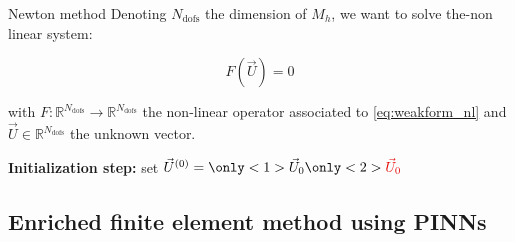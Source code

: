 \begin{frame}{Newton method}
	Denoting $N_\text{dofs}$ the dimension of $M_h$, we want to solve the-non linear system:

    \normalsize
    \vspace{-10pt}
    \begin{equation*}
        F(\vec{U}) = 0 
    \end{equation*}

    with $F:\mathbb{R}^{N_\text{dofs}} \to \mathbb{R}^{N_\text{dofs}}$ the non-linear operator associated to \eqref{eq:weakform_nl} and $\vec{U}\in \mathbb{R}^{N_\text{dofs}}$ the unknown vector. %

	\setcounter{algocf}{0}
    \begin{center}
        \small
        \begin{minipage}{0.9\linewidth}
            \begin{algorithm}[H]
                \SetAlgoLined
                \caption{Newton algorithm} %
                \textbf{Initialization step:} set $\vec{U}^{(0)} = \only<1>{\vec{U}_0}\only<2>{\textcolor{darkred}{\vec{U}_0}}$\;
            \end{algorithm}
        \end{minipage}
        
    \end{center}

\end{frame}

\subsection[Enriched FEM using PINNs]{Enriched finite element method using PINNs}

